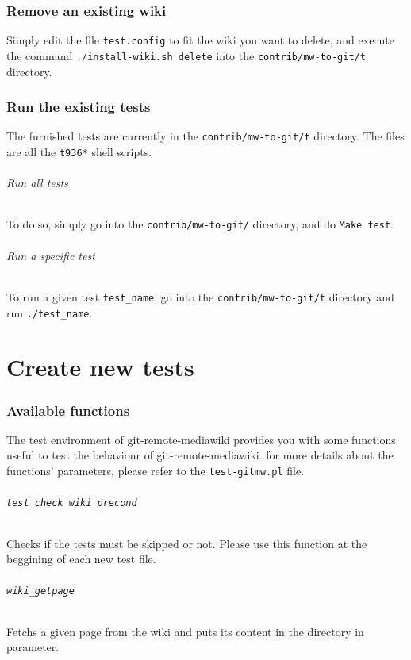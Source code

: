 \documentclass[11pt]{article}
\begin{document}
\section{Remove an existing wiki}
Simply edit the file \lstinline!test.config! to fit the wiki you want
to delete, and execute the command \lstinline!./install-wiki.sh
delete! into the \lstinline!contrib/mw-to-git/t! directory.
\section{Run the existing tests}
The furnished tests are currently in the
\lstinline!contrib/mw-to-git/t! directory. The files are all the
\lstinline!t936*! shell scripts.

\paragraph*{Run all tests}
To do so, simply go into the \lstinline!contrib/mw-to-git/! directory,
and do \lstinline!Make test!.

\paragraph*{Run a specific test}
To run a given test \lstinline!test_name!, go into the
\lstinline!contrib/mw-to-git/t! directory and run
\lstinline!./test_name!.

\part*{Create new tests}

\section{Available functions}
The test environment of git-remote-mediawiki provides you with some
functions useful to test the behaviour of git-remote-mediawiki. for
more details about the functions' parameters, please refer to the
\lstinline!test-gitmw.pl! file.

\paragraph*{\lstinline!test_check_wiki_precond!}
Checks if the tests must be skipped or not. Please use this function
at the beggining of each new test file.

\paragraph*{\lstinline!wiki_getpage!}
Fetchs a given page from the wiki and puts its content in the
directory in parameter.
\end{document}
